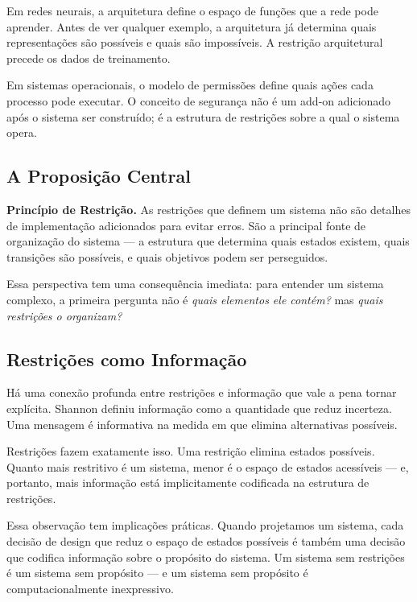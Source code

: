 \documentclass[11pt, a4paper]{article}
\theoremstyle{named}
\begin{document}
Em redes neurais, a arquitetura define o espaço de funções que a rede
pode aprender. Antes de ver qualquer exemplo, a arquitetura já determina
quais representações são possíveis e quais são impossíveis. A restrição
arquitetural precede os dados de treinamento.

Em sistemas operacionais, o modelo de permissões define quais ações
cada processo pode executar. O conceito de segurança não é um add-on
adicionado após o sistema ser construído; é a estrutura de restrições
sobre a qual o sistema opera.

\subsection{A Proposição Central}

\begin{caixachave}
\textbf{Princípio de Restrição.} As restrições que definem um sistema
não são detalhes de implementação adicionados para evitar erros. São a
principal fonte de organização do sistema — a estrutura que determina
quais estados existem, quais transições são possíveis, e quais objetivos
podem ser perseguidos.
\end{caixachave}

Essa perspectiva tem uma consequência imediata: para entender um sistema
complexo, a primeira pergunta não é \emph{quais elementos ele contém?}
mas \emph{quais restrições o organizam?}

\subsection{Restrições como Informação}

Há uma conexão profunda entre restrições e informação que vale a pena
tornar explícita. Shannon definiu informação como a quantidade que reduz
incerteza. Uma mensagem é informativa na medida em que elimina
alternativas possíveis.

Restrições fazem exatamente isso. Uma restrição elimina estados
possíveis. Quanto mais restritivo é um sistema, menor é o espaço de
estados acessíveis — e, portanto, mais informação está implicitamente
codificada na estrutura de restrições.

Essa observação tem implicações práticas. Quando projetamos um sistema,
cada decisão de design que reduz o espaço de estados possíveis é também
uma decisão que codifica informação sobre o propósito do sistema.
Um sistema sem restrições é um sistema sem propósito — e um sistema
sem propósito é computacionalmente inexpressivo.
\end{document}
